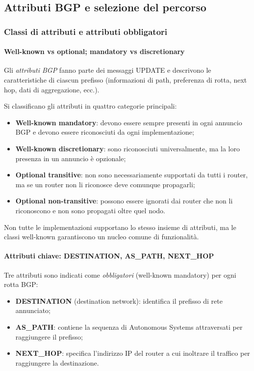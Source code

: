 \subsection{Attributi BGP e selezione del percorso}

\subsubsection{Classi di attributi e attributi obbligatori}

\paragraph{Well-known vs optional; mandatory vs discretionary}

Gli \emph{attributi BGP} fanno parte dei messaggi UPDATE e descrivono le caratteristiche di ciascun prefisso (informazioni di path, preferenza di rotta, next hop, dati di aggregazione, ecc.).

Si classificano gli attributi in quattro categorie principali:
\begin{itemize}
    \item \textbf{Well-known mandatory}: devono essere sempre presenti in ogni annuncio BGP e devono essere riconosciuti da ogni implementazione;
    \item \textbf{Well-known discretionary}: sono riconosciuti universalmente, ma la loro presenza in un annuncio è opzionale;
    \item \textbf{Optional transitive}: non sono necessariamente supportati da tutti i router, ma se un router non li riconosce deve comunque propagarli;
    \item \textbf{Optional non-transitive}: possono essere ignorati dai router che non li riconoscono e non sono propagati oltre quel nodo.
\end{itemize}

Non tutte le implementazioni supportano lo stesso insieme di attributi, ma le classi well-known garantiscono un nucleo comune di funzionalità.

\paragraph{Attributi chiave: DESTINATION, AS\_PATH, NEXT\_HOP}

Tre attributi sono indicati come \emph{obbligatori} (well-known mandatory) per ogni rotta BGP:
\begin{itemize}
    \item \textbf{DESTINATION} (destination network): identifica il prefisso di rete annunciato;
    \item \textbf{AS\_PATH}: contiene la sequenza di Autonomous Systems attraversati per raggiungere il prefisso;
    \item \textbf{NEXT\_HOP}: specifica l’indirizzo IP del router a cui inoltrare il traffico per raggiungere la destinazione.
\end{itemize}

